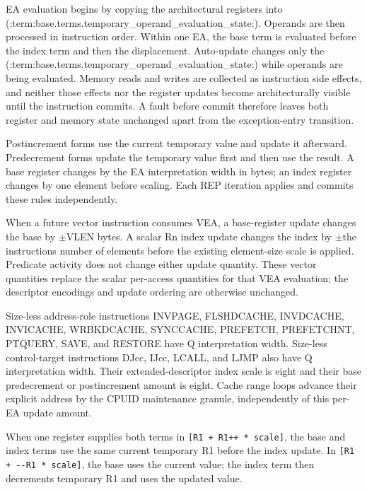 EA evaluation begins by copying the architectural registers into (:term:base.terms.temporary_operand_evaluation_state:). Operands are
then processed in instruction order. Within one EA, the base term is evaluated before the index term and then the
displacement. Auto-update changes only the (:term:base.terms.temporary_operand_evaluation_state:) while operands are being evaluated. Memory reads and
writes are collected as instruction side effects, and neither those effects nor the register updates become
architecturally visible until the instruction commits. A fault before commit therefore leaves both register and
memory state unchanged apart from the exception-entry transition.

Postincrement forms use the current temporary value and update it afterward. Predecrement forms update the temporary
value first and then use the result. A base register changes by the EA interpretation width in bytes; an index
register changes by one element before scaling. Each REP iteration applies and commits these rules independently.

When a future vector instruction consumes VEA, a base-register update changes the base by \(\pm\)VLEN bytes. A
scalar Rn index update changes the index by \(\pm\)the instruction\textquotesingle{}s number of elements before the existing
element-size scale is applied. Predicate activity does not change either update quantity. These vector quantities
replace the scalar per-access quantities for that VEA evaluation; the descriptor encodings and update ordering are
otherwise unchanged.

Size-less address-role instructions INVPAGE, FLSHDCACHE, INVDCACHE, INVICACHE, WRBKDCACHE, SYNCCACHE, PREFETCH,
PREFETCHNT, PTQUERY, SAVE, and RESTORE have Q interpretation width. Size-less control-target instructions DJcc, IJcc,
LCALL, and LJMP also have Q interpretation width. Their extended-descriptor index scale is eight and their base predecrement or
postincrement amount is eight. Cache range loops advance their explicit address by the CPUID maintenance granule,
independently of this per-EA update amount.

When one register supplies both terms in \texttt{[R1 + R1++ * scale]}, the base and index terms use the same
current temporary R1 before the index update. In \texttt{[R1 + {-}{-}R1 * scale]}, the base uses the current value;
the index term then decrements temporary R1 and uses the updated value.
